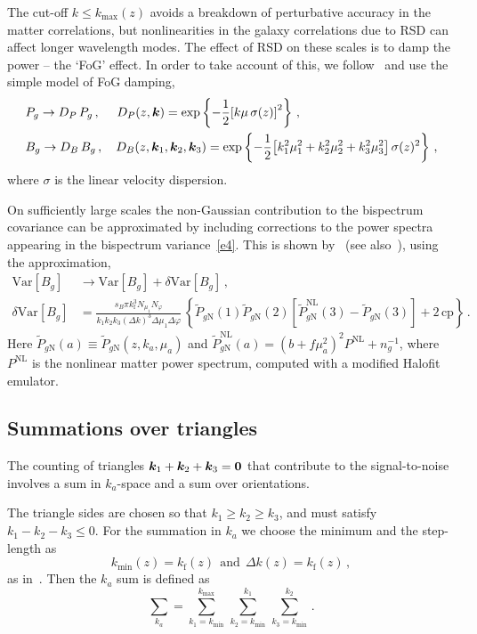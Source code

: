 The cut-off $k\leq k_\mathrm{max}(z)$ avoids a breakdown of perturbative accuracy in the matter correlations, but nonlinearities in the galaxy correlations due to RSD can affect longer wavelength modes. The effect of RSD on these scales is to damp the power -- the `FoG' effect. In order to take account of this, we follow~\cite{Karagiannis:2018jdt,Yankelevich:2018uaz} and use the simple model of FoG damping,
\begin{align}
&P_g \to  D_P\, P_g\,,\quad~ D_{P}(z, \bm{k}) = \exp\left\{-\frac{1}{2}{\left[k\mu\,\sigma(z)\right]^{2}}\right\}\,, \\
&B_g \to  D_B\, B_g\,,  \quad D_{B}(z, \bm {k}_1,\bm {k}_2,\bm {k}_3) = \exp\left\{-\frac{1}{2}{\left[k_{1}^{2}\mu_{1}^{2}+k_{2}^{2}\mu_{2}^{2}+k_{3}^{2}\mu_{3}^{2}\right]\sigma(z)^{2}}\right\}\,, \label{e13}
\end{align}
where $\sigma$ is the linear velocity dispersion.

On sufficiently large scales the non-Gaussian contribution to the bispectrum covariance can be  approximated by including corrections to the power spectra appearing in the bispectrum variance~\eqref{e4}. This is shown by~\cite{Chan:2016ehg} (see also~\cite{Karagiannis:2018jdt}), using the approximation,
\begin{align}
\mathrm{Var} [B_{g}] &\to \mathrm{Var} [B_{g}]+ \delta \mathrm{Var} [B_{g}] \,, \\
\delta \mathrm{Var} [B_{g}] &= \frac{s_B\pi k_\mathrm{f}^3 N_{\mu_1} N_\varphi}{k_1 k_2 k_3 (\Delta k)^3\Delta \mu_1 \Delta \varphi}\, \left\{ \tilde{P}_{g \mathrm{N}}(1) \tilde{P}_{g \mathrm{N}}(2) \left[ \tilde{P}^\mathrm{NL}_{g \mathrm{N}}(3) - \tilde{P}_{g\mathrm{N}}(3) \right] + 2 \, \mbox{cp} \right\}\,.
\label{e4x}
\end{align}
Here $\tilde{P}_{g \mathrm{N}}(a) \equiv \tilde{P}_{g \mathrm{N}}(z,k_a,\mu_a)$ and $\tilde{P}^{\mathrm{NL}}_{g{\mathrm{N}}}(a) = (b + f \mu_a^2)^2 P^\mathrm{NL} + n_g^{-1}$, where $P^{\mathrm{NL}}$ is the nonlinear matter power spectrum, computed with a modified Halofit emulator.
%
%
\subsection{Summations over triangles}

The counting of triangles $\bm {k}_1 + \bm {k}_2 + \bm {k}_3 = \bm{0}$ that contribute to the signal-to-noise involves a sum in $k_a$-space and a sum over orientations.

The triangle sides are chosen so that $k_1\geq k_2 \geq k_3$, and must satisfy $k_1-k_2-k_3\leq 0$.
For the summation in $k_a$ we choose the minimum and the step-length as
\begin{equation}
k_\mathrm{min}(z) = k_\mathrm{f}(z)~~\mbox{and}~~ \Delta k(z)=k_{\mathrm{f}}(z) \,,
\end{equation}
as in~\cite{Karagiannis:2018jdt,Yankelevich:2018uaz}. 
Then the $k_a$ sum is defined as~\cite{Liguori:2010hx,Oddo:2019run}
\begin{equation}
\sum_{k_a} = \sum_{k_{1} = k_\mathrm{min}}^{k_\mathrm{max}} \, \sum_{k_{2}=k_{\mathrm{min}}}^{k_{1}}\,\sum_{k_{3}=k_{\mathrm{min}}}^{k_{2}}
\,.\label{e8}
\end{equation} 

